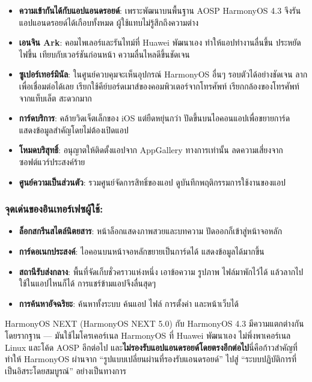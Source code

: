 \begin{itemize}
  \item \textbf{ความเข้ากันได้กับแอปแอนดรอยด์}: เพราะพัฒนาบนพื้นฐาน AOSP HarmonyOS 4.3 จึงรันแอปแอนดรอยด์ได้เกือบทั้งหมด ผู้ใช้แทบไม่รู้สึกถึงความต่าง
  \item \textbf{เอนจิน Ark}: คอมไพเลอร์และรันไทม์ที่ Huawei พัฒนาเอง ทำให้แอปทำงานลื่นขึ้น ประหยัดไฟขึ้น เทียบกับเวอร์ชันก่อนหน้า ความลื่นไหลดีขึ้นชัดเจน
  \item \textbf{ซูเปอร์เทอร์มินัล}: ในศูนย์ควบคุมจะเห็นอุปกรณ์ HarmonyOS อื่นๆ รอบตัวได้อย่างชัดเจน ลากเพื่อเชื่อมต่อได้เลย เรียกใช้คีย์บอร์ดเมาส์ของคอมพิวเตอร์จากโทรศัพท์ เรียกกล้องของโทรศัพท์จากแท็บเล็ต สะดวกมาก
  \item \textbf{การ์ดบริการ}: คล้ายวิดเจ็ตเล็กของ iOS แต่ยืดหยุ่นกว่า ปัดขึ้นบนไอคอนแอปเพื่อขยายการ์ด แสดงข้อมูลสำคัญโดยไม่ต้องเปิดแอป
  \item \textbf{โหมดบริสุทธิ์}: อนุญาตให้ติดตั้งแอปจาก AppGallery ทางการเท่านั้น ลดความเสี่ยงจากซอฟต์แวร์ประสงค์ร้าย
  \item \textbf{ศูนย์ความเป็นส่วนตัว}: รวมศูนย์จัดการสิทธิ์ของแอป ดูบันทึกพฤติกรรมการใช้งานของแอป
\end{itemize}

\subsubsection*{จุดเด่นของอินเทอร์เฟซผู้ใช้:}

\begin{itemize}
  \item \textbf{ล็อกสกรีนสไตล์นิตยสาร}: หน้าล็อกแสดงภาพสวยและบทความ ปัดออกก็เข้าสู่หน้าจอหลัก
  \item \textbf{การ์ดอเนกประสงค์}: ไอคอนบนหน้าจอหลักขยายเป็นการ์ดได้ แสดงข้อมูลได้มากขึ้น
  \item \textbf{สถานีรับส่งกลาง}: พื้นที่จัดเก็บชั่วคราวแห่งหนึ่ง เอาข้อความ รูปภาพ ไฟล์มาพักไว้ได้ แล้วลากไปใช้ในแอปไหนก็ได้ การแชร์ข้ามแอปจึงลื่นสุดๆ
  \item \textbf{การค้นหาอัจฉริยะ}: ค้นหาทั้งระบบ ค้นแอป ไฟล์ การตั้งค่า และหน้าเว็บได้
\end{itemize}


HarmonyOS NEXT (HarmonyOS NEXT 5.0) กับ HarmonyOS 4.3 มีความแตกต่างกันโดยรากฐาน — มันใช้ไมโครเคอร์เนล HarmonyOS ที่ Huawei พัฒนาเอง ไม่พึ่งพาเคอร์เนล Linux และโค้ด AOSP อีกต่อไป และ\textbf{ไม่รองรับแอปแอนดรอยด์โดยตรงอีกต่อไป}นี่คือก้าวสำคัญที่ทำให้ HarmonyOS ผ่านจาก “รูปแบบเปลี่ยนผ่านที่รองรับแอนดรอยด์” ไปสู่ “ระบบปฏิบัติการที่เป็นอิสระโดยสมบูรณ์” อย่างเป็นทางการ

